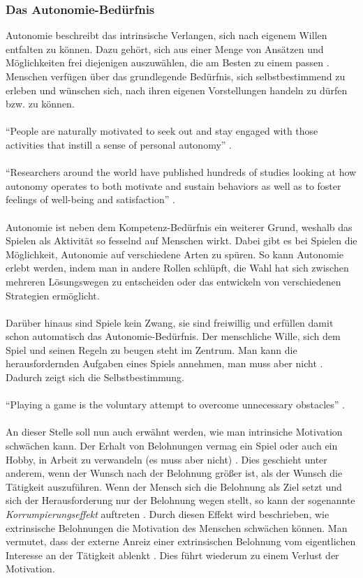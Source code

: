 \documentclass[a4paper,12pt]{scrartcl}
\begin{document}
\subsubsection{Das Autonomie-Bedürfnis}
\label{Punkte und Belohnungen}
Autonomie beschreibt das intrinsische Verlangen, sich nach eigenem Willen entfalten zu können. Dazu gehört, sich aus einer Menge von Ansätzen und Möglichkeiten frei diejenigen auszuwählen, die am Besten zu einem passen \cite{Rigby2011}. Menschen verfügen über das grundlegende Bedürfnis, sich selbstbestimmend zu erleben und wünschen sich, nach ihren eigenen Vorstellungen handeln zu dürfen bzw. zu können.
\\\\
\enquote{People are naturally motivated to seek out and stay engaged with those activities that instill a sense of personal autonomy} \cite{Rigby2011}.
\\\\
\enquote{Researchers around the world have published hundreds of studies looking at how autonomy operates to both motivate and sustain behaviors as well as to foster feelings of well-being and satisfaction} \cite{Rigby2011}.
\\\\
Autonomie ist neben dem Kompetenz-Bedürfnis ein weiterer Grund, weshalb das Spielen als Aktivität so fesselnd auf Menschen wirkt. Dabei gibt es bei Spielen die Möglichkeit, Autonomie auf verschiedene Arten zu spüren. So kann Autonomie erlebt werden, indem man in andere Rollen schlüpft, die Wahl hat sich zwischen mehreren Lösungswegen zu entscheiden oder das entwickeln von verschiedenen Strategien ermöglicht.
\\\\
Darüber hinaus sind Spiele kein Zwang, sie sind freiwillig und erfüllen damit schon automatisch das Autonomie-Bedürfnis. Der menschliche Wille, sich dem Spiel und seinen Regeln zu beugen steht im Zentrum. Man kann die herausfordernden Aufgaben eines Spiels annehmen, man muss aber nicht \cite{Rigby2011}. Dadurch zeigt sich die Selbstbestimmung. 
\\\\
\enquote{Playing a game is the voluntary attempt to overcome unnecessary obstacles} \cite{Mcgonigal2011}.
\\\\
An dieser Stelle soll nun auch erwähnt werden, wie man intrinsiche Motivation schwächen kann. Der Erhalt von Belohnungen vermag ein Spiel oder auch ein Hobby, in Arbeit zu verwandeln (es muss aber nicht) \cite{Pink2010}. Dies geschieht unter anderem, wenn der Wunsch nach der Belohnung größer ist, als der Wunsch die Tätigkeit auszuführen. Wenn der Mensch sich die Belohnung als Ziel setzt und sich der Herausforderung nur der Belohnung wegen stellt, so kann der sogenannte \textit{Korrumpierungseffekt} auftreten \cite{Rheinberg2006}. Durch diesen Effekt wird beschrieben, wie extrinsische Belohnungen die Motivation des Menschen schwächen können. Man vermutet, dass der externe Anreiz einer extrinsischen Belohnung vom eigentlichen Interesse an der Tätigkeit ablenkt \cite{Rheinberg2006}. Dies führt wiederum zu einem Verlust der Motivation.   
\end{document}
